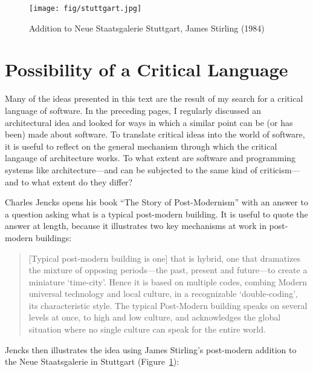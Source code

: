 \begin{figure}
\centering
\texttt{[image: fig/stuttgart.jpg]}
\caption{Addition to Neue Staatsgalerie Stuttgart, James Stirling (1984)}
\label{fig:stuttgart}
\end{figure}

\section{Possibility of a Critical Language}

Many of the ideas presented in this text are the result of my search for a critical
language of software. In the preceding pages, I regularly discussed an architectural idea and
looked for ways in which a similar point can be (or has been) made about software. To translate
critical ideas into the world of software, it is useful to reflect on the general mechanism
through which the critical langauge of architecture works. To what extent are software and
programming systems like architecture---and can be subjected to the
same kind of criticism---and to what extent do they differ?

Charles Jencks opens his book ``The Story of Post-Modernism'' with an answer to
a question asking what is a typical post-modern building. It is useful to quote the answer at length,
because it illustrates two key mechanisms at work in post-modern buildings:

\begin{quote}
[Typical post-modern building is one]
that is hybrid, one that dramatizes the mixture of opposing periods---the past, present and
future---to create a miniature `time-city'. Hence it is based on multiple codes, combing Modern
universal technology and local culture, in a recognizable `double-coding', its characteristic
style. The typical Post-Modern building speaks on several levels at once, to high and low culture,
and acknowledges the global situation where no single culture can speak for the entire world.
\end{quote}

Jencks then illustrates the idea using James Stirling's post-modern addition to the Neue
Staatsgalerie in Stuttgart (Figure~\ref{fig:stuttgart}):

